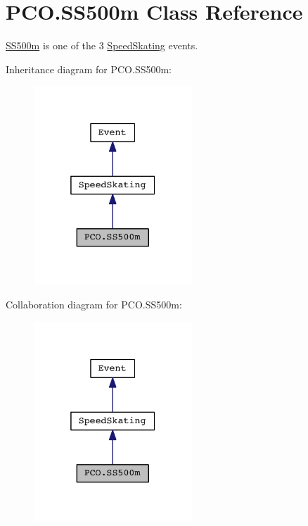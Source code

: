\hypertarget{classPCO_1_1SS500m}{\section{P\+C\+O.\+S\+S500m Class Reference}
\label{classPCO_1_1SS500m}
}


\hyperlink{classPCO_1_1SS500m}{S\+S500m} is one of the 3 \hyperlink{classPCO_1_1SpeedSkating}{Speed\+Skating} events.  




Inheritance diagram for P\+C\+O.\+S\+S500m\+:\nopagebreak
\begin{figure}[H]
\begin{center}
\leavevmode
\includegraphics[width=169pt]{classPCO_1_1SS500m__inherit__graph}
\end{center}
\end{figure}


Collaboration diagram for P\+C\+O.\+S\+S500m\+:\nopagebreak
\begin{figure}[H]
\begin{center}
\leavevmode
\includegraphics[width=169pt]{classPCO_1_1SS500m__coll__graph}
\end{center}
\end{figure}

